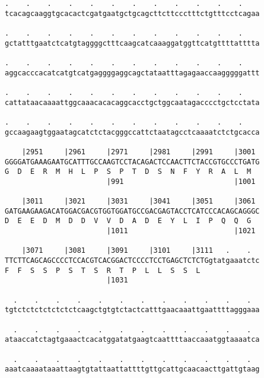 \documentclass{article}
\begin{document}
\begin{Verbatim}
.    .    .    .    .    .    .    .    .    .    .    .    
tcacagcaaggtgcacactcgatgaatgctgcagcttcttccctttctgtttcctcagaa
                                                            
.    .    .    .    .    .    .    .    .    .    .    .    
gctatttgaatctcatgtaggggctttcaagcatcaaaggatggttcatgttttatttta
                                                            
.    .    .    .    .    .    .    .    .    .    .    .    
aggcacccacatcatgtcatgaggggaggcagctataatttagagaaccaagggggattt
                                                            
.    .    .    .    .    .    .    .    .    .    .    .    
cattataacaaaattggcaaacacacaggcacctgctggcaatagacccctgctcctata
                                                            
.    .    .    .    .    .    .    .    .    .    .    .    
gccaagaagtggaatagcatctctacgggccattctaatagcctcaaaatctctgcacca
                                                            
    |2951     |2961     |2971     |2981     |2991     |3001 
GGGGATGAAAGAATGCATTTGCCAAGTCCTACAGACTCCAACTTCTACCGTGCCCTGATG
G  D  E  R  M  H  L  P  S  P  T  D  S  N  F  Y  R  A  L  M  
                        |991                          |1001 
  
    |3011     |3021     |3031     |3041     |3051     |3061 
GATGAAGAAGACATGGACGACGTGGTGGATGCCGACGAGTACCTCATCCCACAGCAGGGC
D  E  E  D  M  D  D  V  V  D  A  D  E  Y  L  I  P  Q  Q  G  
                        |1011                         |1021 
  
    |3071     |3081     |3091     |3101     |3111   .    .  
TTCTTCAGCAGCCCCTCCACGTCACGGACTCCCCTCCTGAGCTCTCTGgtatgaaatctc
F  F  S  S  P  S  T  S  R  T  P  L  L  S  S  L              
                        |1031                               
  
  .    .    .    .    .    .    .    .    .    .    .    .  
tgtctctctctctctctcaagctgtgtctactcatttgaacaaattgaattttagggaaa
                                                            
  .    .    .    .    .    .    .    .    .    .    .    .  
ataaccatctagtgaaactcacatggatatgaagtcaattttaaccaaatggtaaaatca
                                                            
  .    .    .    .    .    .    .    .    .    .    .    .  
aaatcaaaataaattaagtgtattaattattttgttgcattgcaacaacttgattgtaag
                                                            

\end{Verbatim}
\end{document}
